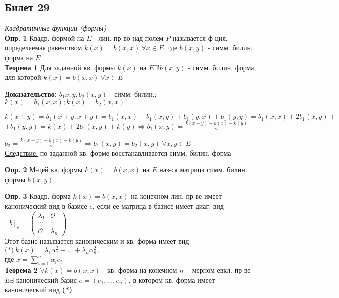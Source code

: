 \subsection{Билет 29}

\textit{Квадратичные функции (формы)}\\

\textbf{Опр. 1} Квадр. формой на $E$ - лин. пр-во над полем $P$ называется ф-ция, определяемая равенством $k(x)=b(x,x)\ \forall x\in E$, где $b(x,y)$ - симм. билин. форма на $E$ \\

\textbf{Теорема 1} Для заданной кв. формы $k(x)$ на $E \exists! b(x,y)$ - симм. билин. форма, для которой $k(x) = b(x,x)\ \forall x\in E$

\textbf{Доказательство: } $b_1{x,y}, b_2(x,y)$ - симм. билин.;\quad $k(x) = b_1(x,x); k(x) = b_2(x,x)$

$k(x+y) = b_1(x+y, x+y) = b_1(x,x) + b_1(x,y) + b_1(y,x) + b_1(y,y) = b_1(x,x) +  2b_1(x,y) +$\\$+ b_1(y,y) = k(x)+2b_1(x,y)+k(y) \Rightarrow b_1(x,y) = \frac{k(x+y) - k(x)-k(y)}{2}$

$b_2 = \frac{k(x+y) - k(x)-k(y)}{2} \Rightarrow b_1(x,y) = b_2(x,y)\ \forall x,y \in E$\\

\underline{Следствие:} по заданной кв. форме восстанавливается симм. билин. форма

\textbf{Опр. 2} М-цей кв. формы $k(x) = b(x,x)$ на $E$ наз-ся матрица симм. билин. формы $b(x,y)$

\textbf{Опр. 3} Квадр. форма $k(x) = b(x,x)$ на конечном лин. пр-ве имеет канонический вид в базисе $e$, если ее матрица в базисе имеет диаг. вид $[b]_e = \begin{pmatrix} \lambda_1 & \mathcal{O} \\ \cdots & \cdots \\ \mathcal{O} & \lambda_n  \end{pmatrix}$\\
Этот базис называется каноническим и кв. форма имеет вид $\textbf{(*)}\ k(x) = \lambda_1 \alpha_1^2 + \ldots + \lambda_n \alpha_n^2,\ $\\ где $x = \sum\limits_{i=1}^n \alpha_i e_i$\\

\textbf{Теорема 2} $\forall k(x) = b(x,x)$ - кв. форма на конечном $n-$мерном евкл. пр-ве $E \exists$ канонический базис $e=(e_1,\ldots,e_n)$, в котором кв. форма имеет канонический вид \textbf{(*)}

